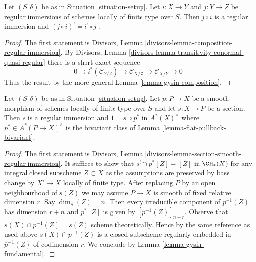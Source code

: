 \begin{lemma}
\label{lemma-composition-regular-immersion}
Let $(S, \delta)$ be as in Situation \ref{situation-setup}.
Let $i : X \to Y$ and $j : Y \to Z$ be regular immersions
of schemes locally of finite type over $S$. Then
$j \circ i$ is a regular immersion and
$(j \circ i)^! = i^! \circ j^!$.
\end{lemma}

\begin{proof}
The first statement is
Divisors, Lemma \ref{divisors-lemma-composition-regular-immersion}.
By Divisors, Lemma \ref{divisors-lemma-transitivity-conormal-quasi-regular}
there is a short exact sequence
$$
0 \to
i^*(\mathcal{C}_{Y/Z}) \to
\mathcal{C}_{X/Z} \to
\mathcal{C}_{X/Y} \to 0
$$
Thus the result by the more general Lemma \ref{lemma-gysin-composition}.
\end{proof}

\begin{lemma}
\label{lemma-section-smooth}
Let $(S, \delta)$ be as in Situation \ref{situation-setup}.
Let $p : P \to X$ be a smooth morphism of schemes locally of finite type
over $S$ and let $s : X \to P$ be a section. Then $s$ is a
regular immersion and $1 = s^! \circ p^*$ in $A^*(X)^\wedge$
where $p^* \in A^*(P \to X)^\wedge$ is the bivariant class
of Lemma \ref{lemma-flat-pullback-bivariant}.
\end{lemma}

\begin{proof}
The first statement is Divisors, Lemma
\ref{divisors-lemma-section-smooth-regular-immersion}.
It suffices to show that $s^! \cap p^*[Z] = [Z]$ in
$\CH_*(X)$ for any integral closed subscheme $Z \subset X$
as the assumptions are preserved by base change by $X' \to X$
locally of finite type. After replacing $P$ by an open neighbourhood
of $s(Z)$ we may assume $P \to X$ is smooth of fixed relative dimension $r$.
Say $\dim_\delta(Z) = n$. Then every irreducible component of $p^{-1}(Z)$
has dimension $r + n$ and $p^*[Z]$ is given by $[p^{-1}(Z)]_{n + r}$.
Observe that $s(X) \cap p^{-1}(Z) = s(Z)$ scheme theoretically. Hence by the
same reference as used above $s(X) \cap p^{-1}(Z)$ is a closed subscheme
regularly embedded in $\overline{p}^{-1}(Z)$ of codimension $r$.
We conclude by Lemma \ref{lemma-gysin-fundamental}.
\end{proof}

